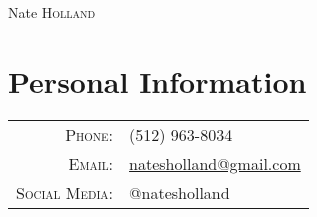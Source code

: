 \documentclass[a4paper,10pt]{article}
\begin{document}
\pagestyle{empty} %

\par{\centering
		{\Huge Nate \textsc{Holland}
	}\bigskip\par}

\section{Personal Information}

\begin{tabular}{rl}
    \textsc{Phone:}     		& (512) 963-8034 \\
    \textsc{Email:}     		& \href{mailto:natesholland@gmail.com}{natesholland@gmail.com} \\
		\textsc{Social Media:}	& @natesholland
\end{tabular}

\end{document}
